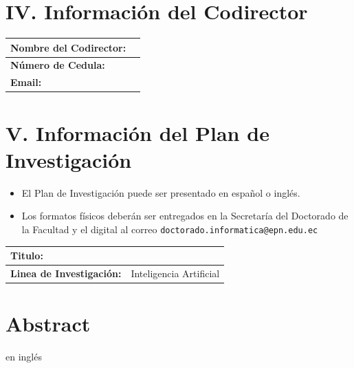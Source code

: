 \documentclass[a4paper,12pt]{article}
\begin{document}
\section*{IV. Información del Codirector}
\begin{longtable}{|p{}|p{}|}
	\hline
	\textbf{Nombre del Codirector:} & \\ \hline
	\textbf{Número de Cedula:}      & \\ \hline
	\textbf{Email:}                 & \\ \hline
\end{longtable}

\section*{V. Información del Plan de Investigación}

\begin{itemize}
	\item El Plan de Investigación puede ser presentado en español o inglés.
	\item Los formatos físicos deberán ser entregados en la Secretaría del Doctorado de la Facultad y el digital al correo \texttt{doctorado.informatica@epn.edu.ec}
\end{itemize}

\begin{longtable}{|p{}|p{}|}
	\hline
	\textbf{Titulo:}                 &                         \\ \hline
	\textbf{Linea de Investigación:} & Inteligencia Artificial \\ \hline
	
\end{longtable}

\thispagestyle{empty}  %
\newpage
\tableofcontents
\newpage
\section*{Abstract} en inglés
\end{document}
